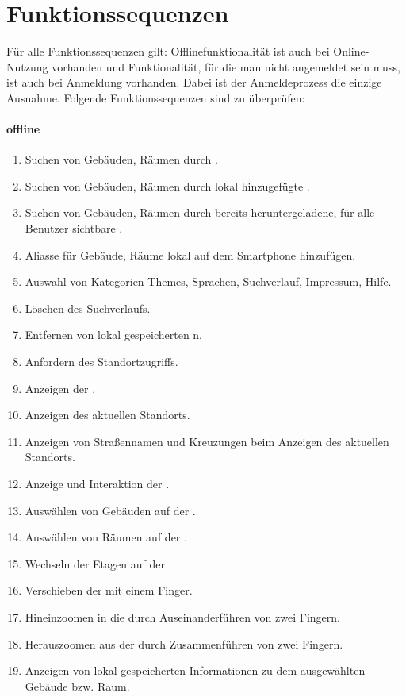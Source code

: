 \section{Funktionssequenzen}

Für alle Funktionssequenzen gilt:
Offlinefunktionalität ist auch bei Online-Nutzung vorhanden und Funktionalität, für die man nicht angemeldet sein muss, ist auch bei Anmeldung vorhanden. Dabei ist der Anmeldeprozess die einzige Ausnahme.
Folgende Funktionssequenzen sind zu überprüfen:

\paragraph{%
	offline}
\begin{enumerate}[label=\textbf{/T\arabic*0/}, align=left]
	\item Suchen von Gebäuden, Räumen durch %
		.
	\item Suchen von Gebäuden, Räumen durch lokal hinzugefügte %
		.
	\item Suchen von Gebäuden, Räumen durch bereits heruntergeladene, für alle Benutzer sichtbare %
		.
	\item Aliasse für Gebäude, Räume lokal auf dem Smartphone hinzufügen.
	\item Auswahl von Kategorien Themes, Sprachen, Suchverlauf, Impressum, Hilfe.
	\item Löschen des Suchverlaufs.
	\item Entfernen von lokal gespeicherten %
		n.
	\item Anfordern des Standortzugriffs.
	\item Anzeigen der %
		.
	\item Anzeigen des aktuellen Standorts.
	\item Anzeigen von Straßennamen und Kreuzungen beim Anzeigen des aktuellen Standorts.
	\item Anzeige und Interaktion der %
		.
	\item Auswählen von Gebäuden auf der %
		.
	\item Auswählen von Räumen auf der %
		.
	\item Wechseln der Etagen auf der %
		.
	\item Verschieben der %
		mit einem Finger.
	\item Hineinzoomen in die %
		durch Auseinanderführen von zwei Fingern.
	\item Herauszoomen aus der %
		durch Zusammenführen von zwei Fingern.
	\item Anzeigen von lokal gespeicherten Informationen zu dem ausgewählten Gebäude bzw. Raum.
\end{enumerate}

